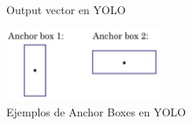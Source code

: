 \begin{figure}[p]
\begin{subfigure}[h!]{.4\textwidth}
        \caption{Output vector en YOLO}
    \end{subfigure}
    \begin{subfigure}[h!]{.6\textwidth}
        \raggedleft
        \includegraphics[width=\linewidth]{img/anchor-boxes-yolo-2.png}
        \caption{Ejemplos de Anchor Boxes en YOLO}
    \end{subfigure}
    \begin{subfigure}[h!]{.15\textwidth}
        \raggedright

\end{subfigure}
\end{figure}
